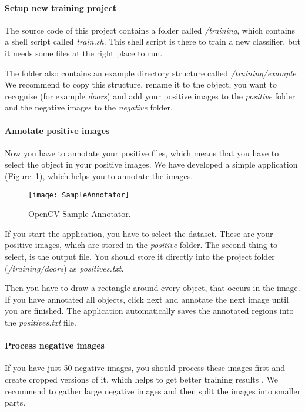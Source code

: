\paragraph{Setup new training project}

The source code of this project contains a folder called \textit{/training}, which contains a shell script called \textit{train.sh}. This shell script is there to train a new classifier, but it needs some files at the right place to run.

The folder also contains an example directory structure called \textit{/training/example}. We recommend to copy this structure, rename it to the object, you want to recognise (for example \textit{doors}) and add your positive images to the \textit{positive} folder and the negative images to the \textit{negative} folder.

\paragraph{Annotate positive images}

Now you have to annotate your positive files, which means that you have to select the object in your positive images. We have developed a simple application (Figure~\ref{fig:SampleAnnotator}), which helps you to annotate the images.

\begin{figure}[H]
	\centering
	\texttt{[image: SampleAnnotator]}
	\caption{OpenCV Sample Annotator.}
	\label{fig:SampleAnnotator}
\end{figure}

If you start the application, you have to select the dataset. These are your positive images, which are stored in the \textit{positive} folder. The second thing to select, is the output file. You should store it directly into the project folder (\textit{/training/doors}) as \textit{positives.txt}.

Then you have to draw a rectangle around every object, that occurs in the image. If you have annotated all objects, click next and annotate the next image until you are finished. The application automatically saves the annotated regions into the \textit{positives.txt} file.


\paragraph{Process negative images}
If you have just 50 negative images, you should process these images first and create cropped versions of it, which helps to get better training results \citep{ball}. We recommend to gather large negative images and then split the images into smaller parts.

